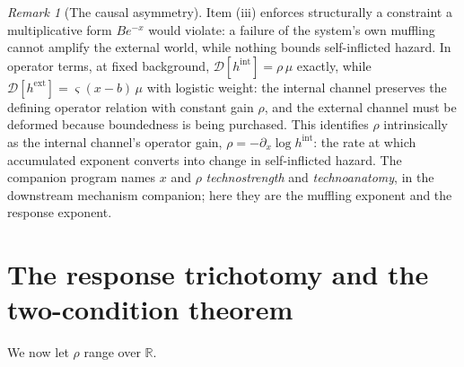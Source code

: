 \documentclass[11pt]{article}
\theoremstyle{definition}
\theoremstyle{remark}
\newtheorem{remark}[theorem]{Remark}
\newcommand{\R}{\mathbb{R}}
\begin{document}
\begin{remark}[The causal asymmetry]
Item (iii) enforces structurally a constraint a multiplicative form
$Be^{-x}$ would violate: a failure of the system's own muffling cannot
amplify the external world, while nothing bounds self-inflicted
hazard. In operator terms, at fixed background,
$\mathcal D[h^{\mathrm{int}}]=\rho\,\mu$ exactly, while
$\mathcal D[h^{\mathrm{ext}}]=\varsigma(x-b)\,\mu$ with logistic
weight: the internal channel preserves the defining operator relation
with constant gain $\rho$, and the external channel must be deformed
because boundedness is being purchased. This identifies $\rho$
intrinsically as the internal channel's operator gain,
$\rho=-\partial_x\log h^{\mathrm{int}}$: the rate at which accumulated
exponent converts into change in self-inflicted hazard. The companion
program names $x$ and $\rho$ \emph{technostrength} and
\emph{technoanatomy}, in the downstream mechanism companion; here they
are the muffling
exponent and the response exponent.
\end{remark}

\section{The response trichotomy and the two-condition theorem}
\label{sec:trichotomy}

We now let $\rho$ range over $\R$.
\end{document}
